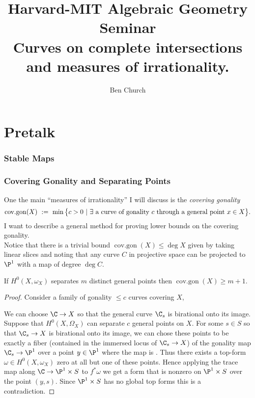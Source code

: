 \documentclass[12pt]{article}
\theoremstyle{plain}
\DeclareMathOperator{\cov}{cov.gon}
\DeclareMathOperator{\cg}{cov.gon}
\DeclareMathOperator{\covgon}{cov.gon}
\begin{document}
\title{Harvard-MIT Algebraic Geometry Seminar \\ \large Curves on complete intersections and measures of irrationality.}
\author{Ben Church}
\maketitle
\tableofcontents

\section{Pretalk}

\subsubsection{Stable Maps}

\subsubsection{Covering Gonality and Separating Points}

One the main ``measures of irrationality'' I will discuss is the \textit{covering gonality}
\[ \cov(X)\ :=\ \min\big\{c>0\ |\ \exists\textup{ a curve of gonality } c \textup{ through a general point } x\in X\big\}.\]
I want to describe a general method for proving lower bounds on the covering gonality. 
\bigskip\\
Notice that there is a trivial bound $\covgon(X) \le \deg{X}$ given by taking linear slices and noting that any curve  $C$ in projective space can be projected to $\P^1$ with a map of degree $\deg{C}$. 


\begin{prop}
If $H^0(X, \omega_X)$ separates $m$ distinct general points then $\cg(X) \ge m + 1$.
\end{prop}

\begin{proof}
Consider a family of gonality $\le c$ curves covering $X$,
\begin{center}
\end{center}
We can choose $\C \to X$ so that the general curve $\C_s$ is birational onto its image. 
Suppose that $H^0(X, \Omega_X)$ can separate $c$ general points on $X$. For some $s \in S$ so that $\C_s \to X$ is birational onto its image, we can chose these points to be exactly a fiber (contained in the immersed locus of $\C_s \to X$) of the gonality map $\C_s \to \P^1$ over a point $y \in \P^1$ where the map is \etale. Thus there exists a top-form $\omega \in H^0(X, \omega_X)$ zero at all but one of these points. Hence applying the trace map along $\C \to \P^1 \times S$ to $f^* \omega$ we get a form that is nonzero on $\P^1 \times S$ over the point $(y, s)$. Since $\P^1 \times S$ has no global top forms this is a contradiction.
\end{proof}
\end{document}
